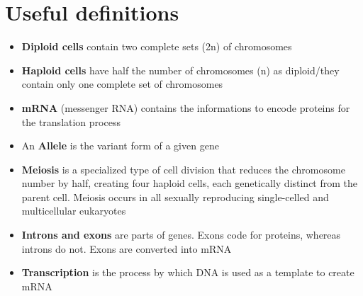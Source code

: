 \newpage
\section{Useful definitions}

\begin{itemize}
	\item \textbf{Diploid cells} contain two complete sets (2n) of
chromosomes
	\item \textbf{Haploid cells} have half the number of chromosomes
(n) as diploid/they contain only one complete set of chromosomes
	\item \textbf{mRNA} (messenger RNA) contains the informations to encode
proteins for the translation process
	\item An \textbf{Allele} is the variant form of a given gene
	\item \textbf{Meiosis} is a specialized type of cell division that
reduces the chromosome number by half, creating four haploid cells, each
genetically distinct from the parent cell. Meiosis occurs in all sexually
reproducing single-celled and multicellular eukaryotes
	\item \textbf{Introns and exons} are parts of genes.
Exons code for proteins, whereas introns do not. Exons are converted into
mRNA
	\item \textbf{Transcription} is the process by which DNA is used as a
template to create mRNA
\end{itemize}
